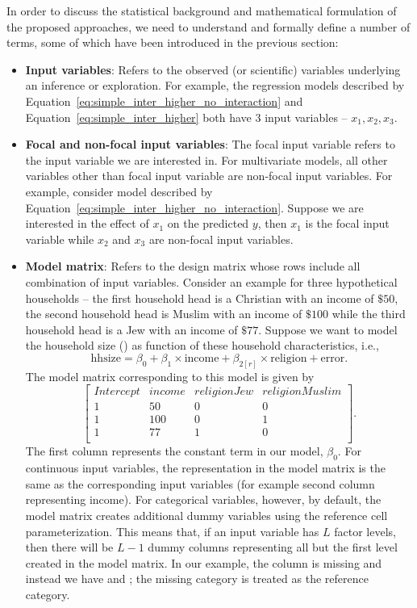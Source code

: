 In order to discuss the statistical background and mathematical formulation of the proposed approaches, we need to understand and formally define a number of terms, some of which have been introduced in the previous section:

\begin{itemize}
\item \textbf{Input variables}: Refers to the observed (or scientific) variables underlying an inference or exploration. For example, the regression models described by Equation~\ref{eq:simple_inter_higher_no_interaction} and Equation~\ref{eq:simple_inter_higher} both have $3$ input variables -- $x_1, x_2, x_3$.
\item \textbf{Focal and non-focal input variables}: The focal input variable refers to the input variable we are interested in. For multivariate models, all other variables other than focal input variable are non-focal input variables. For example, consider model described by Equation~\ref{eq:simple_inter_higher_no_interaction}. Suppose we are interested in the effect of $x_1$ on the predicted $y$, then $x_1$ is the focal input variable while $x_2$ and $x_3$ are non-focal input variables.
\item \textbf{Model matrix}: Refers to the design matrix whose rows include all combination of input variables. Consider an example for three hypothetical households -- the first household head is a Christian with an income of $\$ 50$, the second household head is Muslim with an income of $\$ 100$ while the third household head is a Jew with an income of $\$ 77$. Suppose we want to model the household size () as function of these household characteristics, i.e., $$\mathrm{hhsize} = \beta_0 + \beta_1\times\mathrm{income} + \beta_{2[r]}\times\mathrm{religion} + \mathrm{error}.$$ The model matrix corresponding to this model is given by
$$\begin{bmatrix}{}
 Intercept & income & religionJew & religionMuslim \\
 1 & 50 & 0 & 0 \\
  1 & 100 & 0 & 1 \\
  1 & 77 & 1 & 0 \\
\end{bmatrix}.$$ The first column represents the constant term in our model, $\beta_0$. For continuous input variables, the representation in the model matrix is the same as the corresponding input variables (for example second column representing income). For categorical variables, however, by default, the model matrix  creates additional dummy variables using the reference cell parameterization. This means that, if an input variable has $L$ factor levels, then there will be $L-1$ dummy columns representing all but the first level created in the model matrix. In our example, the column  is missing and instead we have  and ; the missing category  is treated as the reference category.

\end{itemize}
